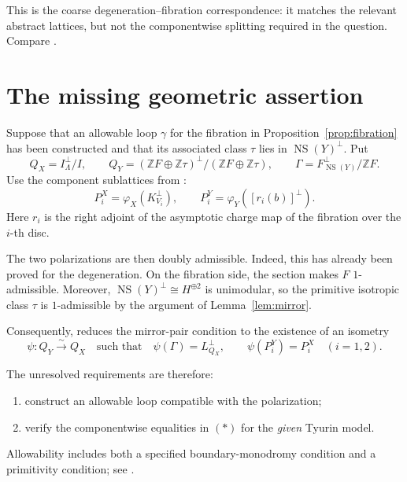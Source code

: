 \documentclass[11pt]{amsart}
\newcommand{\Z}{\mathbb Z}
\newcommand{\NS}{\operatorname{NS}}
\theoremstyle{remark}
\begin{document}
This is the coarse degeneration--fibration correspondence: it matches
the relevant abstract lattices, but not the componentwise splitting
required in the question.  Compare \cite[Proposition~4.1]{DHT17}.

\section{The missing geometric assertion}

Suppose that an allowable loop \(\gamma\) for the fibration in
Proposition~\ref{prop:fibration} has been constructed and that its
associated class \(\tau\) lies in \(\NS(Y)^\perp\).
Put
\[
 Q_X=I^\perp_\Lambda/I,\qquad
 Q_Y=(\Z F\oplus\Z\tau)^\perp/(\Z F\oplus\Z\tau),\qquad
 \Gamma=F^\perp_{\NS(Y)}/\Z F.
\]
Use the component sublattices from \cite[Definition~5.1]{GT24}:
\[
 P_i^X=\varphi_X(K_{V_i}^{\perp}),
 \qquad
 P_i^Y=\varphi_Y([r_i(b)]^{\perp}).
\]
Here \(r_i\) is the right adjoint of the asymptotic charge map of
the fibration over the \(i\)-th disc.

The two polarizations are then doubly admissible.
Indeed, this has already been proved for the degeneration.
On the fibration side, the section makes \(F\) \(1\)-admissible.
Moreover, \(\NS(Y)^\perp\cong H^{\oplus2}\) is unimodular, so the
primitive isotropic class \(\tau\) is \(1\)-admissible by the argument
of Lemma~\ref{lem:mirror}.

Consequently, \cite[Proposition~5.3]{GT24} reduces the mirror-pair
condition to the existence of an isometry
\[
 \psi:Q_Y\xrightarrow{\sim}Q_X
 \quad\text{such that}\quad
 \psi(\Gamma)=L^\perp_{Q_X},
 \qquad
 \psi(P_i^Y)=P_i^X\quad(i=1,2).
 \tag{*}
\]

The unresolved requirements are therefore:
\begin{enumerate}
 \item construct an allowable loop compatible with the polarization;
 \item verify the componentwise equalities in \((*)\) for the
       \emph{given} Tyurin model.
\end{enumerate}
Allowability includes both a specified boundary-monodromy condition
and a primitivity condition; see
\cite[Assumption~4.9 and Definition~4.11]{GT24}.
\end{document}
